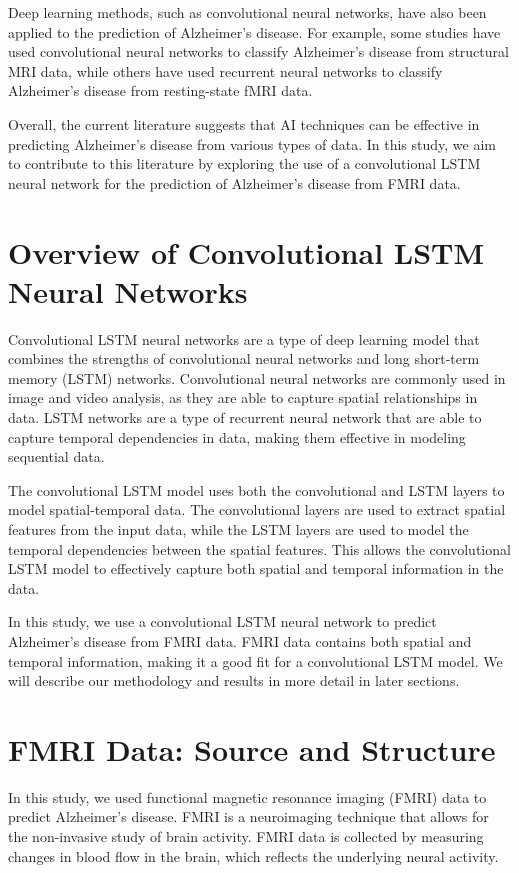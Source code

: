 \documentclass[10pt]{article}
\begin{document}
	Deep learning methods, such as convolutional neural networks, have also been applied to the prediction of Alzheimer's disease. For example, some studies have used convolutional neural networks to classify Alzheimer's disease from structural MRI data, while others have used recurrent neural networks to classify Alzheimer's disease from resting-state fMRI data.

	Overall, the current literature suggests that AI techniques can be effective in predicting Alzheimer's disease from various types of data. In this study, we aim to contribute to this literature by exploring the use of a convolutional LSTM neural network for the prediction of Alzheimer's disease from FMRI data.

	\section{Overview of Convolutional LSTM Neural Networks}

	Convolutional LSTM neural networks are a type of deep learning model that combines the strengths of convolutional neural networks and long short-term memory (LSTM) networks. Convolutional neural networks are commonly used in image and video analysis, as they are able to capture spatial relationships in data. LSTM networks are a type of recurrent neural network that are able to capture temporal dependencies in data, making them effective in modeling sequential data.

	The convolutional LSTM model uses both the convolutional and LSTM layers to model spatial-temporal data. The convolutional layers are used to extract spatial features from the input data, while the LSTM layers are used to model the temporal dependencies between the spatial features. This allows the convolutional LSTM model to effectively capture both spatial and temporal information in the data.

	In this study, we use a convolutional LSTM neural network to predict Alzheimer's disease from FMRI data. FMRI data contains both spatial and temporal information, making it a good fit for a convolutional LSTM model. We will describe our methodology and results in more detail in later sections.

	\section{FMRI Data: Source and Structure}
	\label{sec:data}

	In this study, we used functional magnetic resonance imaging (FMRI) data to predict Alzheimer's disease. FMRI is a neuroimaging technique that allows for the non-invasive study of brain activity. FMRI data is collected by measuring changes in blood flow in the brain, which reflects the underlying neural activity.
\end{document}
